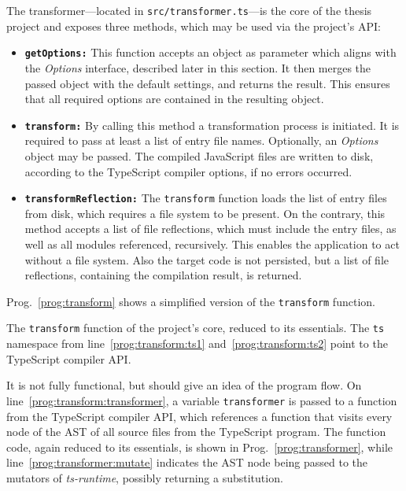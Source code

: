 The transformer---located in \texttt{src/transformer.ts}---is the core of the thesis project and exposes three methods, which may be used via the project's API:
\begin{itemize}
  \item \texttt{\textbf{getOptions:}} This function accepts an object as parameter which aligns with the \emph{Options} interface, described later in this section. It then merges the passed object with the default settings, and returns the result. This ensures that all required options are contained in the resulting object.
  \item \texttt{\textbf{transform:}} By calling this method a transformation process is initiated. It is required to pass at least a list of entry file names. Optionally, an \emph{Options} object may be passed. The compiled JavaScript files are written to disk, according to the TypeScript compiler options, if no errors occurred.
  \item \texttt{\textbf{transformReflection:}} The \texttt{transform} function loads the list of entry files from disk, which requires a file system to be present. On the contrary, this method accepts a list of file reflections, which must include the entry files, as well as all modules referenced, recursively. This enables the application to act without a file system. Also the target code is not persisted, but a list of file reflections, containing the compilation result, is returned.
\end{itemize}
Prog.~\ref{prog:transform} shows a simplified version of the \texttt{transform} function.
\begin{program}
\caption{The \texttt{transform} function of the project's core, reduced to its essentials. The \texttt{ts} namespace from line~\ref{prog:transform:ts1} and~\ref{prog:transform:ts2} point to the TypeScript compiler API.}
\label{prog:transform}
\begin{JsCode}
function transform(entryFiles: string[], options?: Options} {
  const opts = getOptions(options);
  const program = ts.createProgram(entryFiles, opts.compilerOptions); /+\label{prog:transform:ts1}+/
  const scanner = new Scanner(program, opts);
  const files = program.getSourceFiles();
  const result = ts.transform(files, [transformer], opts.compilerOptions); /+\label{prog:transform:ts2}+/ /+\label{prog:transform:transformer}+/
  emit(result);
}
\end{JsCode}
\end{program}
It is not fully functional, but should give an idea of the program flow. On line~\ref{prog:transform:transformer}, a variable \texttt{transformer} is passed to a function from the TypeScript compiler API, which references a function that visits every node of the AST of all source files from the TypeScript program. The function code, again reduced to its essentials, is shown in Prog.~\ref{prog:transformer}, while line~\ref{prog:transformer:mutate} indicates the AST node being passed to the mutators of \emph{ts-runtime}, possibly returning a substitution.
